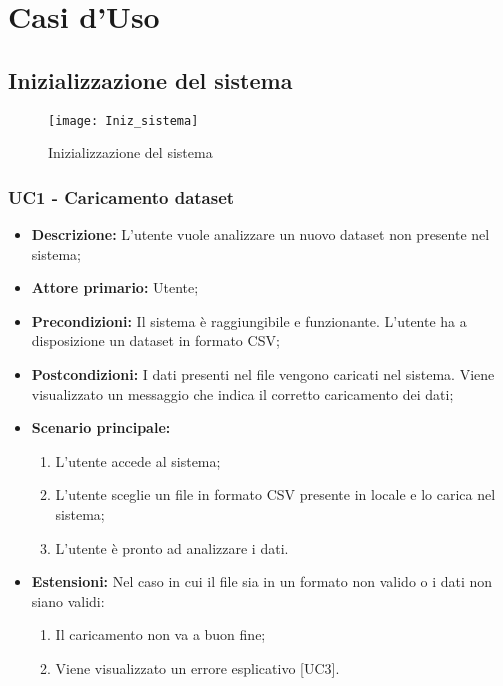 \chapter{Casi d'Uso}


\section{Inizializzazione del sistema}
\begin{figure}[h]
  \centering
  \texttt{[image: Iniz\_sistema]}
  \caption{Inizializzazione del sistema}
\end{figure}
\subsection{UC1 - Caricamento dataset}
\begin{itemize}
  \item \textbf{Descrizione:} L'utente vuole analizzare un nuovo dataset non presente nel sistema;
  \item \textbf{Attore primario:} Utente;
  \item \textbf{Precondizioni:} Il sistema è raggiungibile e funzionante. L’utente ha a disposizione un dataset in formato CSV;
  \item \textbf{Postcondizioni:} I dati presenti nel file vengono caricati nel sistema. Viene visualizzato un messaggio che indica il corretto caricamento dei dati;
  \item \textbf{Scenario principale:}
  \begin{enumerate}
    \item L'utente accede al sistema;
    \item L'utente sceglie un file in formato CSV presente in locale e lo carica nel sistema;
    \item L'utente è pronto ad analizzare i dati.
  \end{enumerate}
  \item \textbf{Estensioni:}
    Nel caso in cui il file sia in un formato non valido o i dati non siano validi:
    \begin{enumerate}
      \item Il caricamento non va a buon fine;
      \item Viene visualizzato un errore esplicativo [UC3].
    \end{enumerate}
\end{itemize}

